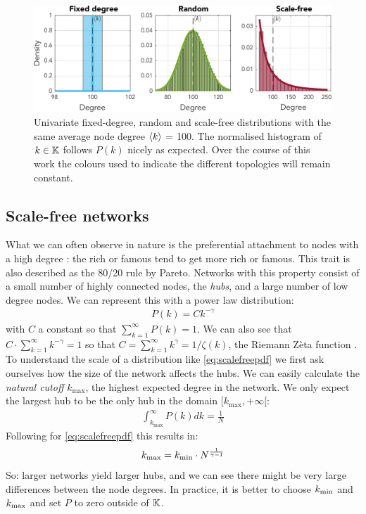 \begin{figure}[H]
\centering
\includegraphics[width = \textwidth]{../Figures/Distributions/1D.pdf}
\caption{Univariate fixed-degree, random and scale-free distributions with the same average node degree ${\langle k\rangle}$ = 100. The normalised histogram of $k \in {\mathbb{K}}$ follows $P(k)$ nicely as expected. Over the course of this work the colours used to indicate the different topologies will remain constant.}
\label{fig:1Dpdfs}
\end{figure}


\subsection{Scale-free networks}
What we can often observe in nature is the preferential attachment to nodes with a high degree \cite{Bullmore2010}: the rich or famous tend to get more rich or famous. This trait is also described as the 80/20 rule by Pareto. Networks with this property consist of a small number of highly connected nodes, the \textsl{hubs}, and a large number of low degree nodes. We can represent this with a power law distribution:
\begin{align}
P(k) = C k^{-\gamma} \label{eq:scalefreepdf}
\end{align}
with $C$ a constant so that $\sum_{k=1}^{\infty} P(k) = 1$. We can also see that $C \cdot \sum_{k=1}^{\infty} k^{-\gamma} = 1$ so that $C = \sum_{k=1}^{\infty} k^{\gamma} = 1/\zeta(k)$, the Riemann Z{\`e}ta function \cite{BarabasiNetworkBook2016}. \\

To understand the scale of a distribution like \eqref{eq:scalefreepdf} we first ask ourselves how the size of the network affects the hubs. We can easily calculate the \textit{natural cutoff} $k_{\text{max}}$, the highest expected degree in the network. We only expect the largest hub to be the only hub in the domain $[k_{\text{max}}, +\infty[$:
\begin{align*}
\int_{k_{\text{max}}}^{\infty} P(k) dk=\frac{1}{N}
\end{align*}
Following \cite{BarabasiNetworkBook2016} for \eqref{eq:scalefreepdf} this results in:
\begin{align}
k_{\text{max}} = k_{\text{min}} \cdot N^{\frac{1}{\gamma-1}} \label{eq:scalefreecutoff}
\end{align}
So: larger networks yield larger hubs, and we can see there might be very large differences between the node degrees. In practice, it is better to choose $k_{\text{min}}$ and $k_{\text{max}}$ and set $P$ to zero outside of ${\mathbb{K}}$. \\



